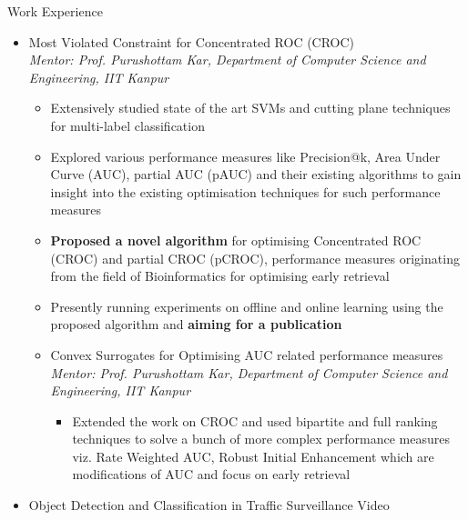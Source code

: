 \documentclass{article}
\begin{document}
{\Large Work Experience}
\renewcommand{\labelitemii}{$\bullet$}
\begin{itemize}[leftmargin=0.07cm]
\item[] {\large Most Violated Constraint for Concentrated ROC (CROC)}\hspace*{\fill}\\
\emph{Mentor: Prof. Purushottam Kar, Department of Computer Science and Engineering, IIT Kanpur
}	\begin{itemize}
	\item Extensively studied state of the art SVMs and cutting plane techniques for multi-label classification
	\item Explored various performance measures like Precision@k, Area Under Curve (AUC), partial AUC (pAUC) and their existing algorithms to gain insight into the existing optimisation techniques for such performance measures
	\item \textbf{Proposed a novel algorithm} for optimising Concentrated ROC (CROC) and partial CROC (pCROC), performance measures originating from the field of Bioinformatics for optimising early retrieval
	\item Presently running experiments on offline and online learning using the proposed algorithm and \textbf{aiming for a publication}
	\end{itemize}
\begin{itemize}[leftmargin=0.07cm]
\newpage
\item[] {\large Convex Surrogates for Optimising AUC related performance measures}\hspace*{\fill}\\
\emph{Mentor: Prof. Purushottam Kar, Department of Computer Science and Engineering, IIT Kanpur
}	\begin{itemize}
	\item Extended the work on CROC and used bipartite and full ranking techniques to solve a bunch of more complex performance measures viz. Rate Weighted AUC, Robust Initial Enhancement which are modifications of AUC and focus on early retrieval
	\end{itemize}
\end{itemize}
\item[] {\large Object Detection and Classification in Traffic Surveillance Video}\hspace*{\fill}\\

\end{itemize}
\end{document}
